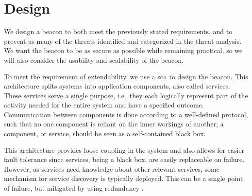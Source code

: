 \section{Design}\label{sec:design}


We design a beacon to both meet the previously stated requirements, and to prevent as many of the threats identified and categorized in the threat analysis. We want the beacon to be as secure as possible while remaining practical, so we will also consider the usability and scalability of the beacon.

To meet the requirement of extendability, we use a \gls{soa} to design the beacon.
This architecture splits systems into application components, also called services.
These services serve a single purpose, i.e.\ they each logically represent part of the activity needed for the entire system and have a specified outcome.
Communication between components is done according to a well-defined protocol, such that no one component is reliant on the inner workings of another;
a component, or service, should be seen as a self-contained black box.

This architecture provides loose coupling in the system and also allows for easier fault tolerance since services, being a black box, are easily replaceable on failure.
However, as services need knowledge about other relevant services, some mechanism for service discovery is typically deployed.
This can be a single point of failure, but mitigated by using redundancy \cite{soa_redundancy}.


